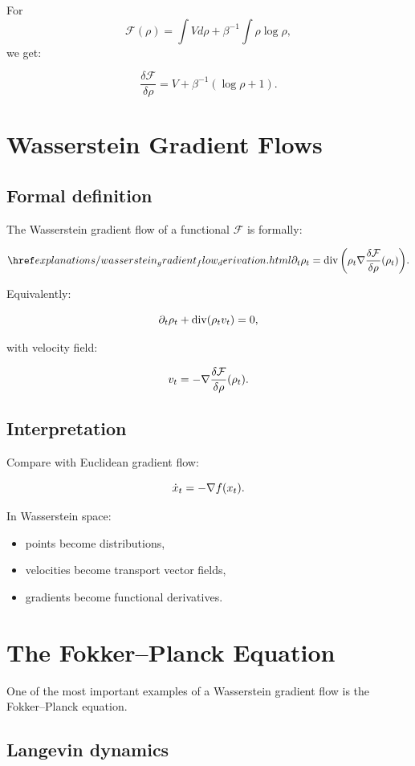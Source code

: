 For
\[
\mathcal F(\rho)
=
\int V d\rho
+
\beta^{-1}
\int \rho\log \rho,
\]
we get:

\[
\frac{\delta \mathcal F}{\delta \rho}
=
V + \beta^{-1}(\log \rho +1).
\]

\section{Wasserstein Gradient Flows}

\subsection{Formal definition}

The Wasserstein gradient flow of a functional $\mathcal F$ is formally:

\[
\explanationlink{wasserstein_gradient_flow_derivation}{\partial_t \rho_t
=
\divergence
\left(
\rho_t
\grad
\frac{\delta \mathcal F}{\delta \rho}(\rho_t)
\right)}.
\]

Equivalently:

\[
\partial_t \rho_t
+
\operatorname{div}(\rho_t v_t)=0,
\]

with velocity field:

\[
v_t
=
-\nabla
\frac{\delta \mathcal F}{\delta \rho}(\rho_t).
\]

\subsection{Interpretation}

Compare with Euclidean gradient flow:

\[
\dot x_t = -\nabla f(x_t).
\]

In Wasserstein space:

\begin{itemize}
    \item points become distributions,
    \item velocities become transport vector fields,
    \item gradients become functional derivatives.
\end{itemize}

\section{The Fokker--Planck Equation}

One of the most important examples of a Wasserstein gradient flow is the Fokker--Planck equation.

\subsection{Langevin dynamics}

